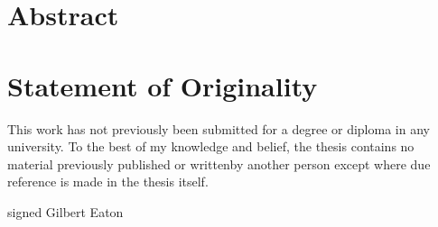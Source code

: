 \documentclass[fleqn,twoside]{article}
\begin{document}
\restoregeometry





\section*{Abstract}




\vspace*{\fill}%




\newpage

\section*{Statement of Originality}

This work has not previously been submitted for a degree or diploma in any university. To the
best of my knowledge and belief, the thesis contains no material previously published or writtenby another person except where due reference is made in the thesis itself.

\vspace{50pt}

signed
Gilbert Eaton

\vspace*{\fill}%



\newpage
\end{document}
